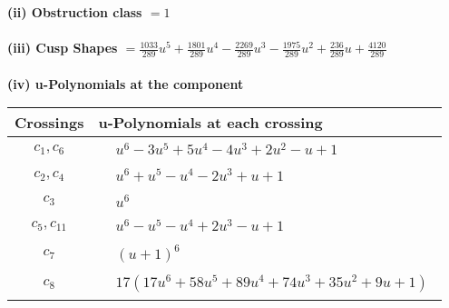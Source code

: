 \documentclass[1p]{elsarticle_modified}
\theoremstyle{definition}
\begin{document}
\flushleft \textbf{(ii) Obstruction class $= 1$}\\~\\
\flushleft \textbf{(iii) Cusp Shapes $= \frac{1033}{289} u^5+\frac{1801}{289} u^4-\frac{2269}{289} u^3-\frac{1975}{289} u^2+\frac{236}{289} u+\frac{4120}{289}$}\\~\\
\newpage\renewcommand{\arraystretch}{1}
\flushleft \textbf{(iv) u-Polynomials at the component}\newline \\
\begin{tabular}{m{50pt}|m{274pt}}
Crossings & \hspace{64pt}u-Polynomials at each crossing \\
\hline $$\begin{aligned}c_{1},c_{6}\end{aligned}$$&$\begin{aligned}
&u^6-3 u^5+5 u^4-4 u^3+2 u^2- u+1
\end{aligned}$\\
\hline $$\begin{aligned}c_{2},c_{4}\end{aligned}$$&$\begin{aligned}
&u^6+u^5- u^4-2 u^3+u+1
\end{aligned}$\\
\hline $$\begin{aligned}c_{3}\end{aligned}$$&$\begin{aligned}
&u^6
\end{aligned}$\\
\hline $$\begin{aligned}c_{5},c_{11}\end{aligned}$$&$\begin{aligned}
&u^6- u^5- u^4+2 u^3- u+1
\end{aligned}$\\
\hline $$\begin{aligned}c_{7}\end{aligned}$$&$\begin{aligned}
&(u+1)^6
\end{aligned}$\\
\hline $$\begin{aligned}c_{8}\end{aligned}$$&$\begin{aligned}
&17(17 u^6+58 u^5+89 u^4+74 u^3+35 u^2+9 u+1)
\end{aligned}$\\

\end{tabular}
\end{document}

